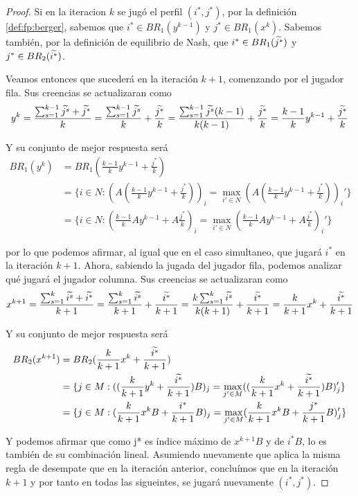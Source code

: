 \begin{proof}
    Si en la iteracion $k$ se jugó el perfil $(i^*, j^*)$, por la definición \ref{def:fp:berger}, sabemos que $i^* \in BR_1(y^{k-1})$ y $j^* \in BR_1(x^{k})$. Sabemos también, por la definición de equilibrio de Nash, que $i^* \in BR_1(\widetilde{j^*})$ y $j^* \in BR_2(\widetilde{i^*})$.

    Veamos entonces que sucederá en la iteración $k+1$, comenzando por el jugador fila. Sus creencias se actualizaran como
    \[
        y^k = \frac{\sum_{s=1}^{k-1}{\widetilde{j^s}} + \widetilde{j^*}}{k}
            = \frac{\sum_{s=1}^{k-1}{\widetilde{j^s}}}{k} + \frac{\widetilde{j^*}}{k}
            = \frac{\sum_{s=1}^{k-1}{\widetilde{j^s}}(k-1)}{k(k-1)} + \frac{\widetilde{j^*}}{k}
            = \frac{k - 1}{k} y^{k-1} + \frac{\widetilde{j^*}}{k}
    \]

    Y su conjunto de mejor respuesta será
    \begin{align*}
        BR_1(y^k) &= BR_1(\frac{k - 1}{k} y^{k-1} + \frac{j^*}{k}) \\
        &= \{i \in N : (A(\frac{k - 1}{k} y^{k-1} + \frac{j^*}{k}))_i = \max_{i' \in N} (A(\frac{k - 1}{k} y^{k-1} + \frac{j^*}{k}))_i'\}\\
        &= \{i \in N : (\frac{k - 1}{k} Ay^{k-1} + A\frac{j^*}{k})_i = \max_{i' \in N} (\frac{k - 1}{k} Ay^{k-1} + A\frac{j^*}{k})_i'\}
    \end{align*}

    por lo que podemos afirmar, al igual que en el caso simultaneo, que jugará $i^*$ en la iteración $k+1$. Ahora, sabiendo la jugada del jugador fila, podemos analizar qué jugará el jugador columna. Sus creencias se actualizaran como
    \[
        x^{k+1} = \frac{\sum_{s=1}^{k}{\widetilde{i^s}} + \widetilde{i^*}}{k+1}
            = \frac{\sum_{s=1}^{k}{\widetilde{i^s}}}{k+1} + \frac{\widetilde{i^*}}{k+1}
            = \frac{k\sum_{s=1}^{k}{\widetilde{i^s}}}{k(k+1)} + \frac{\widetilde{i^*}}{k+1}
            = \frac{k}{k+1} x^{k} + \frac{\widetilde{i^*}}{k+1}
    \]

    Y su conjunto de mejor respuesta será
    \begin{align*}
        BR_2(x^{k+1}) &= BR_2(\frac{k}{k+1} x^{k} + \frac{\widetilde{i^*}}{k+1}) \\
        &= \{
            j \in M :
            ((\frac{k}{k+1} y^{k} + \frac{\widetilde{i^*}}{k+1})B)_j
            = \max_{j' \in M} ((\frac{k}{k+1} x^{k} + \frac{\widetilde{i^*}}{k+1})B)_j'
        \}\\
        &= \{
            j \in M :
            (\frac{k}{k+1} x^{k}B + \frac{i^*}{k+1}B)_j =
            \max_{j' \in M} (\frac{k}{k+1} x^{k}B + \frac{j^*}{k+1}B)_j'
        \}
    \end{align*}

    Y podemos afirmar que como j* es índice máximo de $x^{k+1}B$ y de $i^*B$, lo es también de su combinación lineal. Asumiendo nuevamente que aplica la misma regla de desempate que en la iteración anterior, concluímos que en la iteración $k+1$ y por tanto en todas las sigueintes, se jugará nuevamente $(i^*, j^*)$.


\end{proof}

